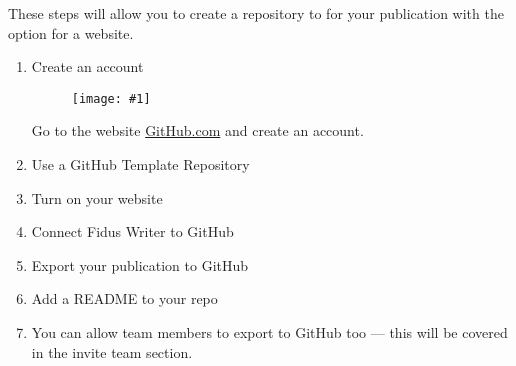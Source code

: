 \documentclass{article}
\newlength{\imgwidth}
\newcommand\scaledgraphics[2]{%
                
\settowidth{\imgwidth}{\texttt{[image: \#1]}}%
                
\setlength{\imgwidth}{\minof{\imgwidth}{#2\textwidth}}%
                
\texttt{[image: \#1]}%
                
}
\begin{document}
These steps will allow you to create a repository to for your publication with the option for a website.

\begin{enumerate}
\item Create an account

\begin{figure}
\scaledgraphics{56369a22-3b5a-4691-aa78-51a8bd4bba37.png}{1}
\label{F22252491}
\end{figure}


Go to the website \href{https://github.com/}{GitHub.com} and create an account.


\item Use a GitHub Template Repository





\item Turn on your website


\item Connect Fidus Writer to GitHub


\item Export your publication to GitHub


\item Add a README to your repo


\item You can allow team members to export to GitHub too — this will be covered in the invite team section.


\end{enumerate}




\printbibliography[title={Bibliography}]
\end{document}

